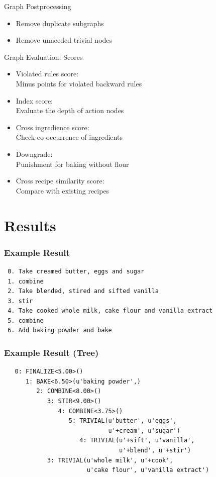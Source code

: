 \documentclass{beamer}
\begin{document}
\begin{frame}{Graph Postprocessing}
 \begin{itemize}
  \item Remove duplicate subgraphs
  \item Remove unneeded trivial nodes
 \end{itemize}

\end{frame}

\begin{frame}{Graph Evaluation: Scores}
 \begin{itemize}
   \item Violated rules score: \\ Minus points for violated backward rules
   \item Index score: \\ Evaluate the depth of action nodes
   \item Cross ingredience score: \\ Check co-occurrence of ingredients
   \item Downgrade: \\ Punishment for baking without flour
   \item Cross recipe similarity score: \\ Compare with existing recipes
 \end{itemize}

\end{frame}

\section{Results}

\begin{frame}[fragile=singleslide]\frametitle{Example Result}
\begin{verbatim}
 0. Take creamed butter, eggs and sugar
 1. combine
 2. Take blended, stired and sifted vanilla
 3. stir
 4. Take cooked whole milk, cake flour and vanilla extract
 5. combine
 6. Add baking powder and bake
\end{verbatim}
\end{frame}

\begin{frame}[fragile=singleslide]\frametitle{Example Result (Tree)}
\begin{verbatim}
   0: FINALIZE<5.00>()
      1: BAKE<6.50>(u'baking powder',)
         2: COMBINE<8.00>()
            3: STIR<9.00>()
               4: COMBINE<3.75>()
                  5: TRIVIAL(u'butter', u'eggs',
                             u'+cream', u'sugar')
                     4: TRIVIAL(u'+sift', u'vanilla',
                                u'+blend', u'+stir')
            3: TRIVIAL(u'whole milk', u'+cook',
                       u'cake flour', u'vanilla extract')
\end{verbatim}
\end{frame}
\end{document}
